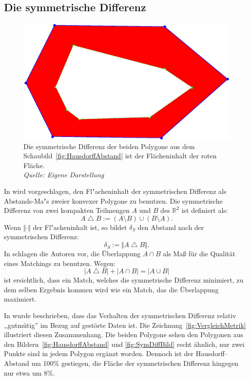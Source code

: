 \subsection{Die symmetrische Differenz}\label{symDiff}
\begin{figure}
	\centering
	\includegraphics[scale=.6]{SymDiff.eps}
	\caption[Symmetrische Differenz zweier Polygone]{Die symmetrische Differenz der beiden Polygone aus dem Schaubild~\vref{fig:HausdorffAbstand} ist der Flächeninhalt der roten Fläche.\\\textit{Quelle: Eigene Darstellung}}
	\label{fig:SymDiffBild}
\end{figure}

In \cite{AFRW} wird vorgeschlagen, den Fl"acheninhalt der symmetrischen Differenz als Abstands-Ma"s zweier konvexer Polygone zu benutzen. Die symmetrische Differenz von zwei kompakten Teilmengen $A$ und $B$ des $\mathbb{R}^2 $ ist definiert als:
\[A\bigtriangleup B:=(A\setminus B)\cup(B\setminus A).\]
Wenn $\Vert\cdot\Vert$ der Fl"acheninhalt ist, so bildet $\delta_S$ den Abstand nach der symmetrischen Differenz:
\[\delta_S:=\Vert A \bigtriangleup B\Vert.\]
In \cite{TG} schlagen die Autoren vor, die Überlappung $A\cap B$ als Maß für die Qualität eines Matchings zu benutzen. Wegen:
$$|A\bigtriangleup B|+|A\cap B|=|A\cup B|$$
ist ersichtlich, dass ein Match, welches die symmetrische Differenz minimiert, zu dem selben Ergebnis kommen wird wie ein Match, das die Überlappung maximiert.

In \cite{AFRW} wurde beschrieben, dass das Verhalten der symmetrischen Differenz relativ ,,gutmütig'' im Bezug auf gestörte Daten ist. Die Zeichnung~\vref{fig:VergleichMetrik} illustriert diesen Zusammenhang. Die beiden Polygone sehen den Polygonen aus den Bildern~\vref{fig:HausdorffAbstand} und \vref{fig:SymDiffBild} recht ähnlich, nur zwei Punkte sind in jedem Polygon ergänzt worden. Dennoch ist der Hausdorff--Abstand um 100\% gestiegen, die Fläche der symmetrischen Differenz hingegen nur etwa um 8\%.

